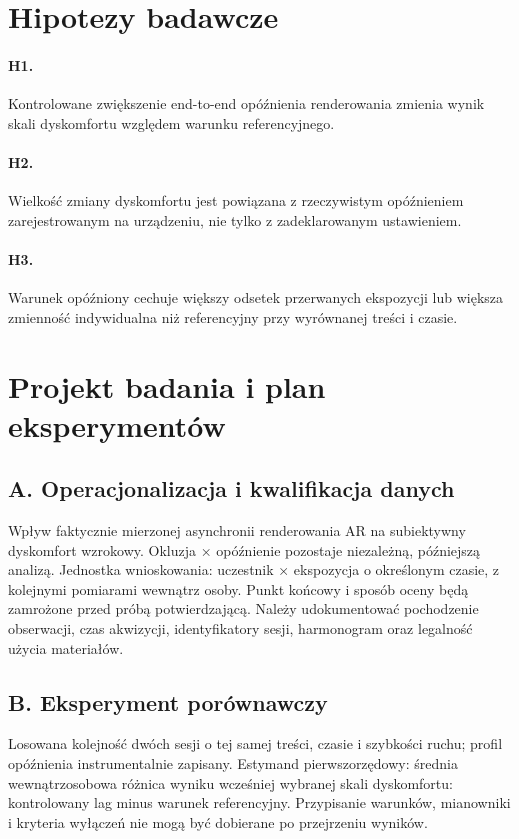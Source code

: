\documentclass[11pt,a4paper]{article}
\begin{document}
\section{Hipotezy badawcze}
\paragraph{H1.} Kontrolowane zwiększenie end-to-end opóźnienia renderowania zmienia wynik skali dyskomfortu względem warunku referencyjnego.
\paragraph{H2.} Wielkość zmiany dyskomfortu jest powiązana z rzeczywistym opóźnieniem zarejestrowanym na urządzeniu, nie tylko z zadeklarowanym ustawieniem.
\paragraph{H3.} Warunek opóźniony cechuje większy odsetek przerwanych ekspozycji lub większa zmienność indywidualna niż referencyjny przy wyrównanej treści i czasie.

\section{Projekt badania i plan eksperymentów}
\subsection{A. Operacjonalizacja i kwalifikacja danych}
Wpływ faktycznie mierzonej asynchronii renderowania AR na subiektywny dyskomfort wzrokowy. Okluzja × opóźnienie pozostaje niezależną, późniejszą analizą. Jednostka wnioskowania: uczestnik × ekspozycja o określonym czasie, z kolejnymi pomiarami wewnątrz osoby. Punkt końcowy i sposób oceny będą zamrożone przed próbą potwierdzającą. Należy udokumentować pochodzenie obserwacji, czas akwizycji, identyfikatory sesji, harmonogram oraz legalność użycia materiałów.

\subsection{B. Eksperyment porównawczy}
Losowana kolejność dwóch sesji o tej samej treści, czasie i szybkości ruchu; profil opóźnienia instrumentalnie zapisany. Estymand pierwszorzędowy: średnia wewnątrzosobowa różnica wyniku wcześniej wybranej skali dyskomfortu: kontrolowany lag minus warunek referencyjny. Przypisanie warunków, mianowniki i kryteria wyłączeń nie mogą być dobierane po przejrzeniu wyników.
\end{document}
